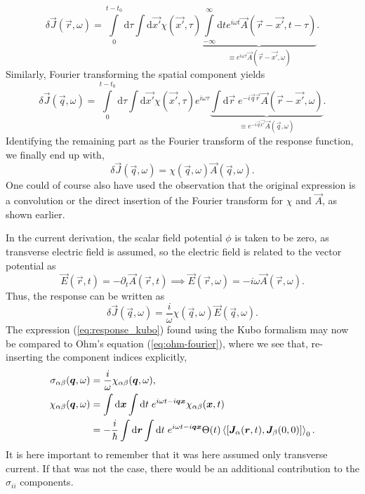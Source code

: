 \begin{equation}
  \delta \vec{J}(\vec{r}, \omega) = 
  \int\limits_0^{t-t_0} \! \mathrm{d}\tau
  \int \mathrm{d}\vec{x'}
  \chi(\vec{x'}, \tau)
  \underbrace{
    \int\limits_{-\infty}^{\infty} \mathrm{d}t
    e^{i \omega t}
    \vec{A}(\vec{r} - \vec{x'}, t-\tau)
    }_{\equiv e^{i\omega \tau} \vec{A}(\vec{r} - \vec{x'}, \omega)}.
\end{equation}
Similarly, Fourier transforming the spatial component yields
\begin{equation}
  \label{eq:resonse_fourier}
  \delta \vec{J}(\vec{q}, \omega) =
  \int\limits_0^{t - t_0}\mathrm{d}\tau
  \int \mathrm{d} \vec{x'}
  \chi(\vec{x'}, \tau)
  e^{i \omega\tau}
  \underbrace{
    \int \mathrm{d}\vec{r} \;
    e^{-i \vec{q} \vec{r}}
  \vec{A}(\vec{r} - \vec{x'}, \omega)
  }_{\equiv e^{-i \vec{q} \vec{x'}} \vec{A}(\vec{q}, \omega)}.
\end{equation}
Identifying the remaining part as the Fourier transform of the response function, we finally end up with,
\begin{equation}
  \delta \vec{J}(\vec{q}, \omega) =
  \chi(\vec{q}, \omega)
  \vec{A}(\vec{q}, \omega).
\end{equation}
One could of course also have used the observation that the original expression is a convolution or the direct insertion of the Fourier transform for $\chi $ and $\vec{A}$, as shown earlier.

In the current derivation, the scalar field potential $\phi$ is taken to be zero, as transverse electric field is assumed, so the electric field is related to the vector potential as
\begin{equation}
  \label{eq:em_field_electric}
  \vec{E}(\vec{r}, t) = -\partial_t \vec{A}(\vec{r}, t) \implies \vec{E}(\vec{r}, \omega) = -i \omega \vec{A}(\vec{r}, \omega).
\end{equation}
Thus, the response can be written as
\begin{equation}
  \label{eq:response_kubo}
  \delta \vec{J}(\vec{q}, \omega) =
  \frac{i}{\omega}
  \chi(\vec{q}, \omega)
  \vec{E}(\vec{q}, \omega).
\end{equation}
The expression (\ref{eq:response_kubo}) found using the Kubo formalism may now be compared to Ohm's equation (\ref{eq:ohm-fourier}), where we see that, re-inserting the component indices explicitly,
\begin{align}
    \sigma_{\alpha\beta}(\vec{q}, \omega) &= \frac{i}{\omega} \chi_{\alpha\beta}(\vec{q}, \omega), \\
  \chi_{\alpha\beta}(\vec{q}, \omega) &= \int \mathrm{d}\vec{x} \int \mathrm{d} t \; e^{i\omega t -i \vec{q} \vec{x}}\chi_{\alpha\beta}(\vec{x}, t)\\
  &=
    -\frac{i}{\hbar}\int \mathrm{d} \vec{r} \int \mathrm{d} t \; e^{i \omega t - i \vec{q} \vec{x}}
    \Theta (t)
    \Braket{\left[
       \vec{J}_{\alpha}(\vec{r}, t), \vec{J}_{\beta}(0, 0)
      \right]}_0. \nonumber
\end{align}
It is here important to remember that it was here assumed only transverse current.
If that was not the case, there would be an additional contribution to the $\sigma_{ii}$ components.

